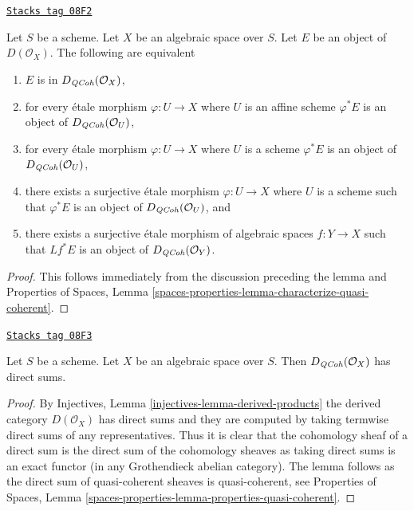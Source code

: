 \begin{lemma}
\label{spaces-perfect-lemma-check-quasi-coherence-on-covering}
\href{https://stacks.math.columbia.edu/tag/08F2}{\texttt{Stacks tag 08F2}}

Let $S$ be a scheme. Let $X$ be an algebraic space over $S$.
Let $E$ be an object of $D(\mathcal{O}_X)$. The following are equivalent
\begin{enumerate}
\item $E$ is in $D_{\mathit{QCoh}}(\mathcal{O}_X)$,
\item for every \'etale morphism $\varphi : U \to X$ where $U$ is an
affine scheme $\varphi^*E$ is an object of
$D_{\mathit{QCoh}}(\mathcal{O}_U)$,
\item for every \'etale morphism $\varphi : U \to X$ where $U$ is a scheme
$\varphi^*E$ is an object of
$D_{\mathit{QCoh}}(\mathcal{O}_U)$,
\item there exists a surjective \'etale morphism $\varphi : U \to X$
where $U$ is a scheme such that $\varphi^*E$ is an object of
$D_{\mathit{QCoh}}(\mathcal{O}_U)$, and
\item there exists a surjective \'etale morphism of algebraic spaces
$f : Y \to X$ such that $Lf^*E$ is an object of
$D_{\mathit{QCoh}}(\mathcal{O}_Y)$.
\end{enumerate}
\end{lemma}

\begin{proof}
This follows immediately from the discussion preceding the lemma and
Properties of Spaces, Lemma
\ref{spaces-properties-lemma-characterize-quasi-coherent}.
\end{proof}

\begin{lemma}
\label{spaces-perfect-lemma-quasi-coherence-direct-sums}
\href{https://stacks.math.columbia.edu/tag/08F3}{\texttt{Stacks tag 08F3}}

Let $S$ be a scheme. Let $X$ be an algebraic space over $S$.
Then $D_{\mathit{QCoh}}(\mathcal{O}_X)$ has direct sums.
\end{lemma}

\begin{proof}
By Injectives, Lemma \ref{injectives-lemma-derived-products}
the derived category $D(\mathcal{O}_X)$ has direct sums and
they are computed by taking termwise direct sums of any representatives.
Thus it is clear that the cohomology sheaf of a direct sum is the
direct sum of the cohomology sheaves as taking direct sums is
an exact functor (in any Grothendieck abelian category). The lemma
follows as the direct sum of quasi-coherent sheaves is quasi-coherent, see
Properties of Spaces, Lemma
\ref{spaces-properties-lemma-properties-quasi-coherent}.
\end{proof}

